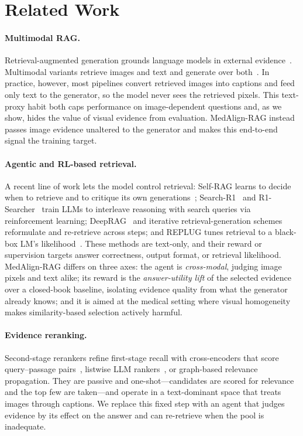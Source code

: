 \section{Related Work}
\label{sec:related_work}

\paragraph{Multimodal RAG.}
Retrieval-augmented generation grounds language models in external
evidence~\cite{lewis2020retrieval}. Multimodal variants retrieve images and text
and generate over both~\cite{chen2022murag,yasunaga2023retrieval}. In practice,
however, most pipelines convert retrieved images into captions and feed only text
to the generator, so the model never sees the retrieved pixels. This text-proxy
habit both caps performance on image-dependent questions and, as we show, hides
the value of visual evidence from evaluation. MedAlign-RAG instead passes image
evidence unaltered to the generator and makes this end-to-end signal the training
target.

\paragraph{Agentic and RL-based retrieval.}
A recent line of work lets the model control retrieval: Self-RAG learns to decide
when to retrieve and to critique its own generations~\cite{asai2024selfrag};
Search-R1~\cite{jin2025searchr1} and R1-Searcher~\cite{song2025r1searcher} train
LLMs to interleave reasoning with search queries via reinforcement learning;
DeepRAG~\cite{guan2025deeprag} and iterative retrieval-generation
schemes~\cite{shao2023iterretgen} reformulate and re-retrieve across steps; and
REPLUG tunes retrieval to a black-box LM's likelihood~\cite{shi2024replug}. These
methods are text-only, and their reward or supervision targets answer
correctness, output format, or retrieval likelihood. MedAlign-RAG differs on
three axes: the agent is \emph{cross-modal}, judging image pixels and text alike;
its reward is the \emph{answer-utility lift} of the selected evidence over a
closed-book baseline, isolating evidence quality from what the generator already
knows; and it is aimed at the medical setting where visual homogeneity makes
similarity-based selection actively harmful.

\paragraph{Evidence reranking.}
Second-stage rerankers refine first-stage recall with cross-encoders that score
query--passage pairs~\cite{nogueira2019passage}, listwise LLM
rankers~\cite{sun2023chatgpt}, or graph-based relevance propagation. They are
passive and one-shot---candidates are scored for relevance and the top few are
taken---and operate in a text-dominant space that treats images through captions.
We replace this fixed step with an agent that judges evidence by its effect on
the answer and can re-retrieve when the pool is inadequate.

